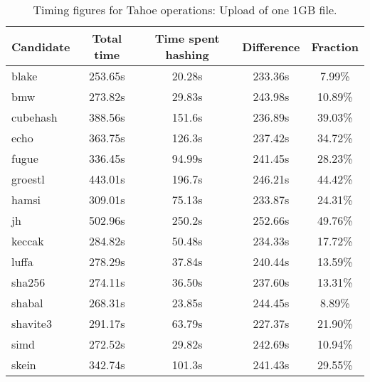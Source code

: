 \begin{table}[h]
  \centering
  \begin{tabular}{ | l | c | c | c | c | }
    \hline
    Candidate & Total time & Time spent hashing & Difference & Fraction \\ \hline
    blake & 253.65s & 20.28s & 233.36s & 7.99\% \\ \hline
    bmw & 273.82s & 29.83s & 243.98s & 10.89\% \\ \hline
    cubehash & 388.56s & 151.6s & 236.89s & 39.03\% \\ \hline
    echo & 363.75s & 126.3s & 237.42s & 34.72\% \\ \hline
    fugue & 336.45s & 94.99s & 241.45s & 28.23\% \\ \hline
    groestl & 443.01s & 196.7s & 246.21s & 44.42\% \\ \hline
    hamsi & 309.01s & 75.13s & 233.87s & 24.31\% \\ \hline
    jh & 502.96s & 250.2s & 252.66s & 49.76\% \\ \hline
    keccak & 284.82s & 50.48s & 234.33s & 17.72\% \\ \hline
    luffa & 278.29s & 37.84s & 240.44s & 13.59\% \\ \hline
    sha256 & 274.11s & 36.50s & 237.60s & 13.31\% \\ \hline
    shabal & 268.31s & 23.85s & 244.45s & 8.89\% \\ \hline
    shavite3 & 291.17s & 63.79s & 227.37s & 21.90\% \\ \hline
    simd & 272.52s & 29.82s & 242.69s & 10.94\% \\ \hline
    skein & 342.74s & 101.3s & 241.43s & 29.55\% \\ \hline
  \end{tabular}
  \caption{Timing figures for Tahoe operations: Upload of one 1GB file.}
  \label{tbl:hashingtimes:put1gb}
\end{table}

